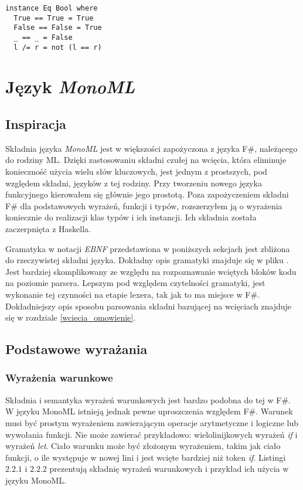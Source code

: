 \documentclass[declaration,shortabstract]{iithesis}
\begin{document}
\begin{lstlisting}[frame=lines]
instance Eq Bool where
  True == True = True 
  False == False = True 
  _ == _ = False
  l /= r = not (l == r)
\end{lstlisting}

\chapter{Język \textit{MonoML}}

\section{Inspiracja}
Składnia języka \textit{MonoML} jest w większości zapożyczona z języka F\#, należącego
do rodziny ML. Dzięki zastosowaniu składni czułej na wcięcia, która eliminuje 
konieczność użycia wielu słów kluczowych, jest jednym z prostszych, pod względem 
składni, języków z tej rodziny. Przy tworzeniu nowego języka funkcyjnego kierowałem się głównie 
jego prostotą. Poza zapożyczeniem składni F\# dla podstawowych wyrażeń,
funkcji i typów, rozszerzyłem ją o wyrażenia koniecznie do realizacji klas 
typów i ich instancji. Ich składnia została zaczerpnięta z Haskella.

Gramatyka w notacji \textit{EBNF} przedstawiona w poniższych sekcjach 
jest zbliżona do rzeczywistej składni języka.
Dokładny opis gramatyki znajduje się w pliku 
. Jest bardziej skomplikowany
ze względu na rozpoznawanie wciętych bloków kodu na
poziomie parsera. Lepszym pod względem czytelności gramatyki, 
jest wykonanie tej czynności na etapie lexera, tak jak to ma miejsce w F\#.
Dokładniejszy opis 
sposobu parsowania składni bazującej na wcięciach znajduje się w rozdziale 
\ref{wciecia_omowienie}. 

\section{Podstawowe wyrażania}

\subsection{Wyrażenia warunkowe}

Składnia i semantyka wyrażeń warunkowych jest bardzo podobna do tej w F\#. W 
języku MonoML
istnieją jednak pewne uproszczenia względem F\#. 
Warunek musi być prostym wyrażeniem zawierającym operacje arytmetyczne i 
logiczne lub wywołania funkcji. Nie może zawierać przykładowo:
wielolinijkowych wyrażeń \textit{if} i wyrażeń \textit{let}. 
Ciało warunku może być złożonym wyrażeniem, takim jak 
ciało funkcji, o ile występuje w nowej lini i jest wcięte bardziej niż 
token \textit{if}. Listingi $2.2.1$ i $2.2.2$ prezentują składnię wyrażeń 
warunkowych i przykład ich użycia w języku MonoML.
\end{document}
